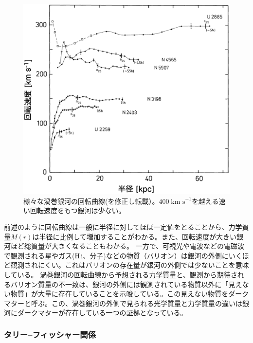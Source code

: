 \begin{figure}[htbp]
\begin{center}
\includegraphics[width=14cm]{galaxy/Sancisi.eps}
\caption{様々な渦巻銀河の回転曲線(\citealt{1987IAUS..117...67S}を修正し転載）。$400\; \mbox{km s}^{-1}$を越える速い回転速度をもつ銀河は少ない。}\label{fig:deblok08}
\end{center}
\end{figure}

前述のように回転曲線は一般に半径に対してほぼ一定値をとることから、力学質量$M(r)$は半径に比例して増加することがわかる。また、回転速度が大きい銀河ほど総質量が大きくなることもわかる。
一方で、可視光や電波などの電磁波で観測される星やガス(H\,{\sc i}、分子)などの物質（バリオン）は銀河の外側にいくほど観測されにくい。これはバリオンの存在量が銀河の外側では少ないことを意味している。
渦巻銀河の回転曲線から予想される力学質量と、観測から期待されるバリオン質量の不一致は、銀河の外側には観測されている物質以外に「見えない物質」が大量に存在していることを示唆している。この見えない物質をダークマターと呼ぶ。この、渦巻銀河の外側で見られる光学質量と力学質量の違いは銀河にダークマターが存在している一つの証拠となっている。


\subsubsection{タリー--フィッシャー関係}\label{sec:TF}

